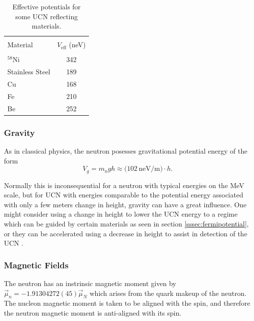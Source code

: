 \begin{table}[h]
  \caption{Effective potentials for some UCN reflecting materials.} 
  \centering
  \begin{tabular}{l c }
    \hline \\ [-1.75ex]
    Material & $V_{\mathrm{eff}}$ (neV) \\
    \hline \hline \\ [-1.75ex]
    $^{58}\mathrm{Ni}$ & 342 \\
    Stainless Steel & 189 \\
    Cu & 168 \\
    Fe & 210 \\
    Be & 252 \\
    \hline
  \end{tabular}
  \label{tab:fermipotential}
\end{table}


\subsubsection{Gravity}

As in classical physics, the neutron posesses gravitational potential energy of the form
%
\begin{equation}
  V_g = m_ngh \approx \big(102 \mathrm{~neV/m}\big) \cdot h.
\end{equation}

Normally this is inconsequential for a neutron with typical energies on the MeV scale,
but for UCN with energies comparable to the potential energy associated with only a few
meters change in height, gravity can have a great influence. One might consider using
a change in height to lower the UCN energy to a regime which can be guided by certain
materials as seen in section \ref{sssec:fermipotential}, or they can be accelerated using
a decrease in height to assist in detection of the UCN \cite{golub1991ultra}.

\subsubsection{Magnetic Fields}

The neutron has an instrinsic magnetic moment given by
$\vec{\mu}_n = -1.91304272(45)\vec{\mu}_N$ \cite{pdg} which arises from the quark makeup of the neutron.
The nucleon magnetic moment is taken to be aligned with the spin, and therefore the neutron magnetic moment
is anti-aligned with its spin.

